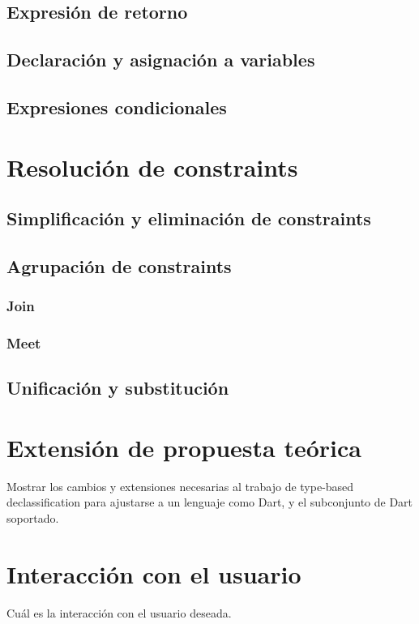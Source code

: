 \subsection{Expresión de retorno}
\subsection{Declaración y asignación a variables}
\subsection{Expresiones condicionales}



\section{Resolución de constraints}

\subsection{Simplificación y eliminación de constraints}
\subsection{Agrupación de constraints}
\subsubsection{Join}
\subsubsection{Meet}
\subsection{Unificación y substitución}


\section{Extensión de propuesta teórica}
Mostrar los cambios y extensiones necesarias al trabajo de type-based declassification para ajustarse a un lenguaje como Dart, y el subconjunto de Dart soportado.

\section{Interacción con el usuario}
Cuál es la interacción con el usuario deseada.
